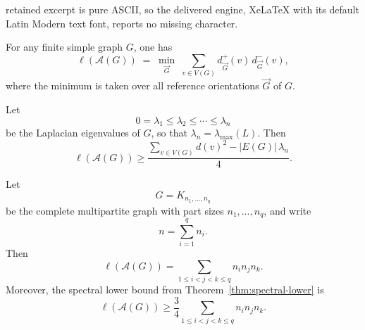 \documentclass[10pt,a4paper]{amsart}
\begin{document}
retained excerpt is pure ASCII, so the delivered engine, XeLaTeX with its default Latin Modern text font, reports no missing character.
\begin{lemma}\label{lem:orientation-frustration}
For any finite simple graph $G$, one has
\[
\ell(\mathcal A(G)) \;=\; \min_{\vec{G}} \;\sum_{v\in V(G)} d^+_{\vec G}(v)\,d^-_{\vec G}(v),
\]
where the minimum is taken over all reference orientations $\vec G$ of $G$.
\end{lemma}

\begin{theorem}
\label{thm:spectral-lower}
Let
\[
0=\lambda_1\le \lambda_2\le \cdots \le \lambda_n
\]
be the Laplacian eigenvalues of $G$, so that $\lambda_n=\lambda_{\max}(L)$.
Then
\[
\ell(\mathcal A(G))
\ge
\frac{\sum_{v\in V(G)} d(v)^2-|E(G)|\,\lambda_n}{4}.
\]
\end{theorem}

\begin{proposition}
\label{prop:complete-multipartite}
Let
\[
G=K_{n_1,\dots,n_q}
\]
be the complete multipartite graph with part sizes $n_1,\dots,n_q$, and write
\[
n=\sum_{i=1}^q n_i.
\]
Then
\[
\ell(\mathcal A(G))
=
\sum_{1\le i<j<k\le q} n_i n_j n_k.
\]
Moreover, the spectral lower bound from Theorem~\ref{thm:spectral-lower} is
\[
\ell(\mathcal A(G))
\ge
\frac34\sum_{1\le i<j<k\le q} n_i n_j n_k.
\]
\end{proposition}
\end{document}
